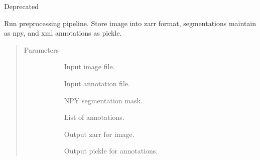 \documentclass[letterpaper,10pt,english]{sphinxmanual}
\begin{document}

\begin{fulllineitems}
\label{\detokenize{index:pathflowai.utils.return_image_in_boxes_dict}}
Deprecated

\end{fulllineitems}


\begin{fulllineitems}
\label{\detokenize{index:pathflowai.utils.run_preprocessing_pipeline}}
Run preprocessing pipeline. Store image into zarr format, segmentations maintain as npy, and xml annotations as pickle.
\begin{quote}\begin{description}
\item[{Parameters}] \leavevmode\begin{description}
\item[{}] \leavevmode
Input image file.

\item[{}] \leavevmode
Input annotation file.

\item[{}] \leavevmode
NPY segmentation mask.

\item[{}] \leavevmode
List of annotations.

\item[{}] \leavevmode
Output zarr for image.

\item[{}] \leavevmode
Output pickle for annotations.

\end{description}

\end{description}\end{quote}

\end{fulllineitems}
\end{document}
